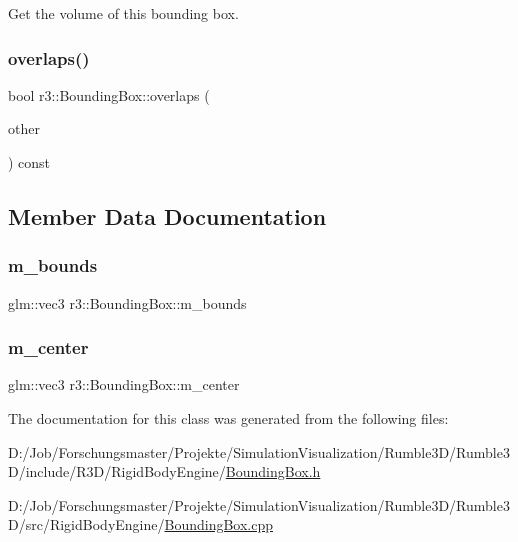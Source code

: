 Get the volume of this bounding box. \mbox{\label{classr3_1_1_bounding_box_a6e69163febe125531fa355ae9876b8be}} 
\subsubsection{\texorpdfstring{overlaps()}{overlaps()}}
{\footnotesize\ttfamily bool r3\+::\+Bounding\+Box\+::overlaps (\begin{DoxyParamCaption}\item[{const \mbox{\hyperlink{classr3_1_1_bounding_box}{Bounding\+Box}} $\ast$}]{other }\end{DoxyParamCaption}) const}



\subsection{Member Data Documentation}
\mbox{\label{classr3_1_1_bounding_box_ad23e4002c102c50ac31f6bb5da6d9d39}} 
\subsubsection{\texorpdfstring{m\+\_\+bounds}{m\_bounds}}
{\footnotesize\ttfamily glm\+::vec3 r3\+::\+Bounding\+Box\+::m\+\_\+bounds\hspace{0.3cm}{\ttfamily [protected]}}

\mbox{\label{classr3_1_1_bounding_box_ae7f47ade2f27fb7e76da58c944141d80}} 
\subsubsection{\texorpdfstring{m\+\_\+center}{m\_center}}
{\footnotesize\ttfamily glm\+::vec3 r3\+::\+Bounding\+Box\+::m\+\_\+center\hspace{0.3cm}{\ttfamily [protected]}}



The documentation for this class was generated from the following files\+:\begin{DoxyCompactItemize}
\item 
D\+:/\+Job/\+Forschungsmaster/\+Projekte/\+Simulation\+Visualization/\+Rumble3\+D/\+Rumble3\+D/include/\+R3\+D/\+Rigid\+Body\+Engine/\mbox{\hyperlink{_bounding_box_8h}{Bounding\+Box.\+h}}\item 
D\+:/\+Job/\+Forschungsmaster/\+Projekte/\+Simulation\+Visualization/\+Rumble3\+D/\+Rumble3\+D/src/\+Rigid\+Body\+Engine/\mbox{\hyperlink{_bounding_box_8cpp}{Bounding\+Box.\+cpp}}\end{DoxyCompactItemize}
